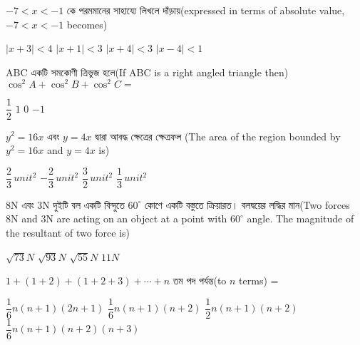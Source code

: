 \documentclass[addpoints]{exam}
\begin{document}
\begin{questions}
\begin{oneparchoices}
\end{oneparchoices}

\question  $ -7<x<-1 $ কে পরমমানের সাহায্যে লিখলে দাঁড়ায়(expressed in terms of absolute value, $ -7<x<-1 $ becomes)
  
\begin{oneparchoices}
\choice $ |x+3|<4 $
\choice $ |x+1|<3 $
\choice $ |x+4|<3 $
\choice  $ |x-4|<1 $

\end{oneparchoices}

\question  ABC একটি সমকোণী ত্রিভুজ হলে(If ABC is a right angled triangle then) $ \cos^{2}A +\cos^{2}B + \cos^{2}C = $
\begin{oneparchoices}
\choice $ \dfrac{1}{2} $
\choice $ 1 $
\choice $ 0 $
\choice  $ -1 $

\end{oneparchoices}

\question $ y^{2} = 16x $ এবং $ y=4x $ দ্বারা আবদ্ধ ক্ষেত্রের ক্ষেত্রফল (The area of the region bounded by $ y^{2} = 16x $ and $ y=4x $ is)

\begin{oneparchoices}
\choice $ \dfrac{2}{3}\, unit^{2}$
\choice $  -\dfrac{2}{3}\, unit^{2} $
\choice $  \dfrac{3}{2}\, unit^{2} $
\choice  $  \dfrac{1}{3}\, unit^{2}$

\end{oneparchoices}

\question   8N এবং 3N দুইটি বল একটি বিন্দুতে $ 60^{\circ} $ কোণে একটি বস্তুতে ক্রিয়ারত। বলদ্বয়ের লদ্ধির মান(Two forces 8N and 3N are acting on an object at a point with $ 60^{\circ} $ angle. The magnitude of the resultant of two force is) 


\begin{oneparchoices}
\choice $ \sqrt{73}N $
\choice $ \sqrt{93}N $
\choice $ \sqrt{55}N $
\choice  $ 11N $

\end{oneparchoices}

\question  $ 1+(1+2)+(1+2+3)+\cdots +n $ তম পদ পর্যন্ত(to $ n $ terms) =

\begin{oneparchoices}
\choice $ \dfrac{1}{6}n(n+1)(2n+1) $
\choice $ \dfrac{1}{6}n(n+1)(n+2) $
\choice $ \dfrac{1}{2}n(n+1)(n+2) $
\choice $ \dfrac{1}{6}n(n+1)(n+2)(n+3) $

\end{oneparchoices}

\end{questions}
\end{document}
